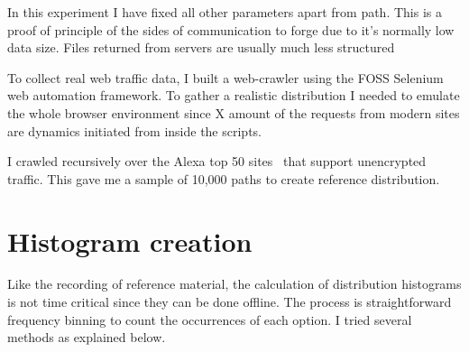 \documentclass[ %
                    author={Samuel Russell},
                supervisor={Prof. Bogdan Warinschi},
                    degree={MEng},
                     title={Innocuous Ciphertexts},
                  subtitle={The DE-CENSOR Scheme},
                      type={research},
                      year={2018} ]{dissertation}
\begin{document}
In this experiment I have fixed all other parameters apart from path. This is a proof of principle
of the sides of communication to forge due to it's normally low data size. Files returned from servers are usually much less structured 

To collect real web traffic data, I built a web-crawler using the FOSS Selenium web automation framework. To gather a realistic distribution I needed to emulate the whole browser environment since X amount of the requests from modern sites are dynamics initiated from inside the scripts.

I crawled recursively over the Alexa top 50 sites~\cite{alexa} that support unencrypted traffic. This gave me a sample of 10,000 paths to create reference distribution.

\section{Histogram creation}

Like the recording of reference material, the calculation of distribution histograms is not time critical since they can be done offline. The process is straightforward frequency binning to count the occurrences of each option. I tried several methods as explained below.
\end{document}
